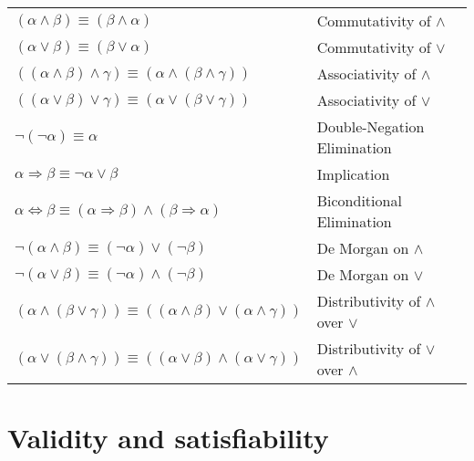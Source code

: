 \documentclass{article}
\begin{document}
\begin{center}
    \begin{tabular}{ll}
        $(\alpha \land \beta) \equiv (\beta \land \alpha)$ & Commutativity of $\land$ \\
        $(\alpha \lor \beta) \equiv (\beta \lor \alpha)$ & Commutativity of $\lor$ \\
        $((\alpha \land \beta) \land \gamma) \equiv (\alpha \land (\beta \land \gamma))$ & Associativity of $\land$ \\
        $((\alpha \lor \beta) \lor \gamma) \equiv (\alpha \lor (\beta \lor \gamma))$ & Associativity of $\lor$ \\
        $\neg (\neg \alpha) \equiv \alpha$ & Double-Negation Elimination \\
        $\alpha \Rightarrow \beta \equiv \neg \alpha \lor \beta$ & Implication \\
        $\alpha \Leftrightarrow \beta \equiv (\alpha \Rightarrow \beta) \land (\beta \Rightarrow \alpha)$ & Biconditional Elimination \\
        $\neg (\alpha \land \beta) \equiv (\neg \alpha) \lor (\neg \beta)$ & De Morgan on $\land$ \\
        $\neg (\alpha \lor \beta) \equiv (\neg \alpha) \land (\neg \beta)$ & De Morgan on $\lor$ \\
        $(\alpha \land (\beta \lor \gamma)) \equiv ((\alpha \land \beta) \lor (\alpha \land \gamma))$ & Distributivity of $\land$ over $\lor$ \\
        $(\alpha \lor (\beta \land \gamma)) \equiv ((\alpha \lor \beta) \land (\alpha \lor \gamma))$ & Distributivity of $\lor$ over $\land$ \\
    \end{tabular}
\end{center}

\hspace{1cm}

\section*{Validity and satisfiability}
\end{document}
